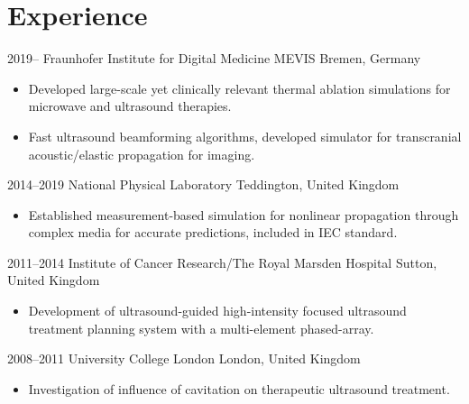 \documentclass[english]{cv-style}
\begin{document}
\section{Experience}
\vspace{-0.2cm}
\begin{entrylist}
\entry
  {2019--}
  {Fraunhofer Institute for Digital Medicine MEVIS}
  {Bremen, Germany}
  {
  \begin{itemize}[topsep=0pt]
\item Developed large-scale yet clinically relevant thermal ablation simulations for microwave and ultrasound therapies.
\item Fast ultrasound beamforming algorithms, developed simulator for transcranial acoustic/elastic propagation for imaging.
  \end{itemize}}
\entry
  {2014--2019}
  {National Physical Laboratory}
  {Teddington, United Kingdom}
  {
  \begin{itemize}
\item Established measurement-based simulation for nonlinear propagation through complex media for accurate predictions, included in IEC standard. 
  \end{itemize}}
\entry
  {2011--2014}
  {Institute of Cancer Research/The Royal Marsden Hospital}
  {Sutton, United Kingdom}
  {
    \begin{itemize}
    \item Development of ultrasound-guided high-intensity focused ultrasound \newline{}treatment planning system with a multi-element phased-array. 
    \end{itemize}}
\entry
  {2008--2011}
  {University College London}
  {London, United Kingdom}
  {
  	\begin{itemize}
      \item Investigation of influence of cavitation on therapeutic ultrasound treatment.
    \end{itemize}}

\end{entrylist}
\end{document}
